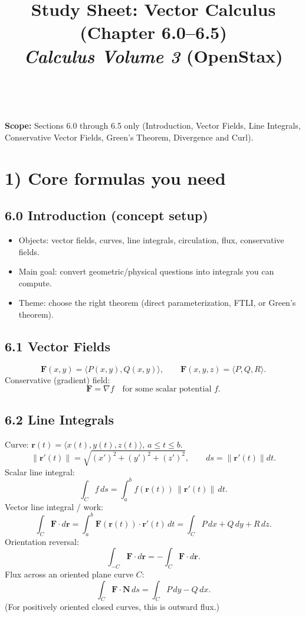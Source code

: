 \documentclass[12pt, twoside]{article}
\title{Study Sheet: Vector Calculus (Chapter 6.0--6.5)\\[0.3em]
{\large\textit{Calculus Volume 3} (OpenStax)}}
\makeatletter
\renewcommand{\maketitle}{%
  \begin{center}
    {\LARGE\textbf{\@title}}\\[0.4em]
  \end{center}
  \vspace{-0.5em}
}
\makeatother
\begin{document}
\maketitle

\noindent\textbf{Scope:} Sections 6.0 through 6.5 only (Introduction, Vector Fields, Line Integrals, Conservative Vector Fields, Green's Theorem, Divergence and Curl).

\bigskip

\section*{1) Core formulas you need}

\subsection*{6.0 Introduction (concept setup)}
\begin{itemize}[leftmargin=*]
  \item Objects: vector fields, curves, line integrals, circulation, flux, conservative fields.
  \item Main goal: convert geometric/physical questions into integrals you can compute.
  \item Theme: choose the right theorem (direct parameterization, FTLI, or Green's theorem).
\end{itemize}

\subsection*{6.1 Vector Fields}
\[
\mathbf{F}(x,y)=\langle P(x,y),Q(x,y)\rangle,
\qquad
\mathbf{F}(x,y,z)=\langle P,Q,R\rangle.
\]
Conservative (gradient) field:
\[
\mathbf{F}=\nabla f
\quad\text{for some scalar potential }f.
\]

\subsection*{6.2 Line Integrals}
Curve: $\mathbf{r}(t)=\langle x(t),y(t),z(t)\rangle$, $a\le t\le b$.
\[
\|\mathbf{r}'(t)\|=\sqrt{(x')^2+(y')^2+(z')^2},
\qquad ds=\|\mathbf{r}'(t)\|dt.
\]
Scalar line integral:
\[
\int_C f\,ds=\int_a^b f(\mathbf{r}(t))\,\|\mathbf{r}'(t)\|\,dt.
\]
Vector line integral / work:
\[
\int_C \mathbf{F}\cdot d\mathbf{r}
=\int_a^b \mathbf{F}(\mathbf{r}(t))\cdot \mathbf{r}'(t)\,dt
=\int_C P\,dx+Q\,dy+R\,dz.
\]
Orientation reversal:
\[
\int_{-C}\mathbf{F}\cdot d\mathbf{r}=-\int_C\mathbf{F}\cdot d\mathbf{r}.
\]
Flux across an oriented plane curve $C$:
\[
\int_C \mathbf{F}\cdot \mathbf{N}\,ds
=\int_C P\,dy-Q\,dx.
\]
(For positively oriented closed curves, this is outward flux.)
\end{document}

